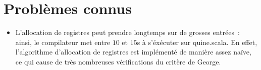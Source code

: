 \documentclass[a4paper,10pt]{article}
\newcommand{\code}[1]{{\fontfamily{pcr}\selectfont #1}}
\begin{document}
\section{Problèmes connus}
\begin{itemize}
\item{L'allocation de registres peut prendre longtemps sur de grosses
    entrées~: ainsi, le compilateur met entre $10$ et $15$s à
    s'éxécuter sur \code{quine.scala}. En effet, l'algorithme
    d'allocation de registres est implémenté de manière assez naïve,
    ce qui cause de très nombreuses vérifications du critère de George.}
\end{itemize}
\end{document}

